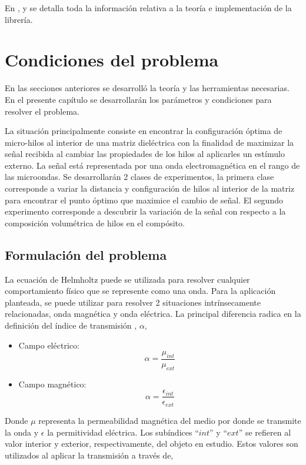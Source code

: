 \documentclass[12pt,letterpaper]{article}
\numberwithin{equation}{section}
\begin{document}
En \cite{paperBEMpp}, \cite{BEMpp_example} y \cite{paginaBEMpp} se detalla toda la información relativa a la teoría e implementación de la librería. 

\section{Condiciones del problema}
En las secciones anteriores se desarrolló la teoría y las herramientas necesarias. En el presente capítulo se desarrollarán los parámetros y condiciones para resolver el problema.

La situación principalmente consiste en encontrar la configuración óptima de micro-hilos al interior de una matriz dieléctrica con la finalidad de maximizar la señal recibida al cambiar las propiedades de los hilos al aplicarles un estímulo externo. La señal está representada por una onda electromagnética en el rango de las microondas. Se desarrollarán 2 clases de experimentos, la primera clase corresponde a variar la distancia y configuración de hilos al interior de la matriz para encontrar el punto óptimo que maximice el cambio de señal. El segundo experimento corresponde a descubrir la variación de la señal con respecto a la composición volumétrica de hilos en el compósito. 

\subsection{Formulación del problema}
La ecuación de Helmholtz puede se utilizada para resolver cualquier comportamiento físico que se represente como una onda. Para la aplicación planteada, se puede utilizar para resolver 2 situaciones intrínsecamente relacionadas, onda magnética y onda eléctrica. La principal diferencia radica en la definición del índice de transmisión \cite{BEMpp_example,Multitrace_acoustic,Multitrace_electromagnetic}, $\alpha$,

\begin{itemize}
	\item Campo eléctrico:
		$$\alpha = \frac{\mu_{int}}{\mu_{ext}}$$
	\item Campo magnético:
		$$\alpha = \frac{\epsilon_{int}}{\epsilon_{ext}}$$	
\end{itemize} 

Donde $\mu$ representa la permeabilidad magnética del medio por donde se transmite la onda y $\epsilon$ la permitividad eléctrica. Los subíndices ``$int$'' y ``$ext$'' se refieren al valor interior y exterior, respectivamente, del objeto en estudio. Estos valores son utilizados al aplicar la transmisión a través de,
\end{document}
